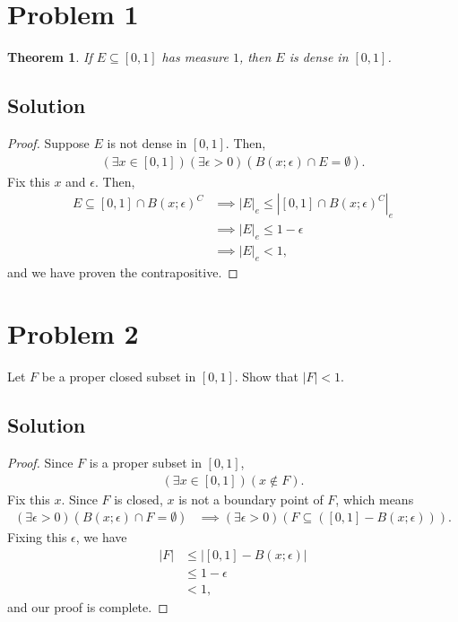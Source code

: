 \documentclass[10pt,a4paper]{article}
\author{Jeremiah Givens}
\theoremstyle{theorem}
\newtheorem{theorem}{Theorem}
\theoremstyle{definition}
\begin{document}
\section*{Problem 1}
\begin{theorem}
If $E \subseteq [0, 1]$ has measure $1$, then $E$ is dense in $[0, 1]$.
\end{theorem}
\subsection*{Solution}
\begin{proof}
Suppose $E$ is not dense in $[0, 1]$. Then, 
\begin{align*}
(\exists x \in [0, 1])(\exists \epsilon > 0)(B(x; \epsilon) \cap E = \emptyset).
\end{align*}
Fix this $x$ and $\epsilon$. Then,
\begin{align*}
E \subseteq [0, 1] \cap B(x; \epsilon)^C &\implies |E|_e \leq |[0, 1] \cap B(x; \epsilon)^C |_e\\
&\implies |E|_e \leq 1 - \epsilon\\
&\implies |E|_e < 1,
\end{align*}
and we have proven the contrapositive. 
\end{proof}

\section*{Problem 2}
Let $F$ be a proper closed subset in $[0, 1]$. Show that $|F| < 1$.

\subsection*{Solution}
\begin{proof}
Since $F$ is a proper subset in $[0, 1]$, 
\begin{align*}
(\exists x \in [0, 1])(x \not\in F).
\end{align*}
Fix this $x$. Since $F$ is closed,  $x$ is not a boundary point of $F$, which means
\begin{align*}
(\exists \epsilon > 0)(B(x; \epsilon) \cap F = \emptyset) &\implies (\exists \epsilon > 0)(F \subseteq ([0,1] - B(x; \epsilon))).
\end{align*}
Fixing this $\epsilon$, we have 
\begin{align*}
|F| &\leq |[0,1] - B(x; \epsilon)|\\
&\leq 1 - \epsilon\\
&< 1,
\end{align*}
and our proof is complete.
\end{proof}
\end{document}
